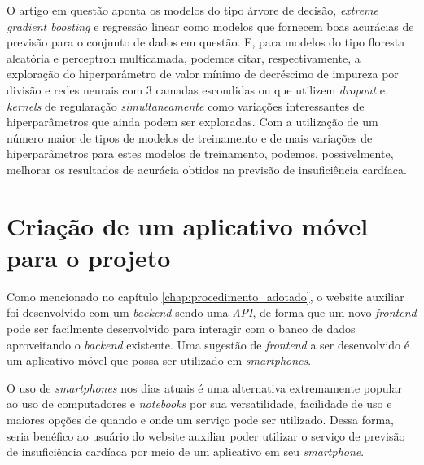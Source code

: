 O artigo em questão aponta os modelos do tipo árvore de decisão, \textit{extreme gradient boosting} e regressão linear como modelos que fornecem boas acurácias de previsão para o conjunto de dados em questão. E, para modelos do tipo floresta aleatória e perceptron multicamada, podemos citar, respectivamente, a exploração do hiperparâmetro de valor mínimo de decréscimo de impureza por divisão e redes neurais com 3 camadas escondidas ou que utilizem \textit{dropout} e \textit{kernels} de regularação \textit{simultaneamente} como variações interessantes de hiperparâmetros que ainda podem ser exploradas. Com a utilização de um número maior de tipos de modelos de treinamento e de mais variações de hiperparâmetros para estes modelos de treinamento, podemos, possivelmente, melhorar os resultados de acurácia obtidos na previsão de insuficiência cardíaca.

\section{Criação de um aplicativo móvel para o projeto}

Como mencionado no capítulo \ref{chap:procedimento_adotado}, o website auxiliar foi desenvolvido com um \textit{backend} sendo uma \textit{API}, de forma que um novo \textit{frontend} pode ser facilmente desenvolvido para interagir com o banco de dados aproveitando o \textit{backend} existente. Uma sugestão de \textit{frontend} a ser desenvolvido é um aplicativo móvel que possa ser utilizado em \textit{smartphones}.

O uso de \textit{smartphones} nos dias atuais é uma alternativa extremamente popular ao uso de computadores e \textit{notebooks} por sua versatilidade, facilidade de uso e maiores opções de quando e onde um serviço pode ser utilizado. Dessa forma, seria benéfico ao usuário do website auxiliar poder utilizar o serviço de previsão de insuficiência cardíaca por meio de um aplicativo em seu \textit{smartphone}.
